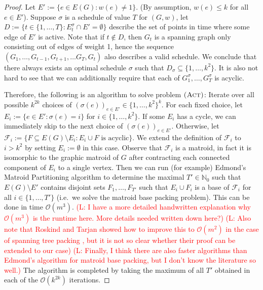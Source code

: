 \documentclass[runningheads]{llncs}
\numberwithin{equation}{section}
\newcommand{\N}{\mathbb{N}}
\newcommand{\set}[1]{\{ #1 \}}
\newcommand{\fromto}[2]{\set{#1, \ldots, #2}}
\newcommand{\comment}[1]{\textcolor{red}{(L: #1)}}
\newcommand{\bigO}{\mathcal{O}}
\newcommand{\act}{\textsc{(Act)}}
\begin{document}
\begin{proof}
Let $E' := \set{e \in E(G) : w(e) \neq 1}$. (By assumption, $w(e) \leq k$ for all $e \in E'$). Suppose $\sigma$ is a schedule of value $T$ for $(G, w)$, let $D := \set{t \in \fromto{1}{T} : E_t^\sigma \cap E' = \emptyset}$ describe the set of points in time where some edge of $E'$ is active. Note that  if $t \not\in D$, then $G_t$ is a spanning graph only consisting out of edges of weight 1, hence the sequence $(G_1, \dots, G_{t-1}, G_{t+1}, \dots G_T, G_t)$ also describes a valid schedule. We conclude that there always exists an optimal schedule $\sigma$ such that $D_\sigma \subseteq \fromto{1}{k^2}$. It is also not  hard to see that we can additionally require that each of $G_1^\sigma, \dots, G_T^\sigma$ is acyclic.

Therefore, the following is an algorithm to solve problem $\act$: Iterate over all possible $k^{2k}$ choices of $(\sigma(e))_{e \in E'} \in \fromto{1}{k^2}^k$. For each fixed choice, let $E_i := \set{e \in E' : \sigma(e) = i}$ for $i \in \fromto{1}{k^2}$. If some $E_i$ has a cycle, we can immediately skip to the next choice of $(\sigma(e))_{e \in E'}$. Otherwise, let $\mathcal{F}_i := \set{F \subseteq E(G) \setminus E_i : E_i \cup F \text{ is acyclic}}$. We extend the definition of $\mathcal{F}_i$ to $i > k^2$ by setting $E_i := \emptyset$ in this case. Observe that $\mathcal{F}_i$ is a matroid, in fact it is isomorphic to the graphic matroid of $G$ after contracting each connected component of $E_i$ to a single vertex. Then we can run (for example)
 Edmond's Matroid Partitioning algorithm to determine the maximal $T' \in \N_0$ such that $E(G) \setminus E'$ contains disjoint sets $F_1, \dots, F_{T'}$ such that $E_i \cup F_i$ is a base of $\mathcal{F}_i$ for all $i \in \fromto{1}{T'}$ (i.e.\ we solve the matroid base packing problem). This can be done in time $\bigO(
m^3)$. \comment{I have a more detailed handwritten explanation why $\bigO(m^3)$ is the runtime here. More details needed written down here?} \comment{Also note that Roskind and Tarjan showed how to improve this to $\bigO(m^2)$ in the case of spanning tree packing \cite{STPMatroidImprovement}, but it is not so clear whether their proof can be extended to our case} \comment{Finally, I think there are also faster algorithms than Edmond's algorithm for matroid base packing, but I don't know the literature so well.} The algorithm is completed by taking the maximum of all $T'$ obtained in each of the $\bigO(k^{2k})$ iterations.
\end{proof}
\end{document}

